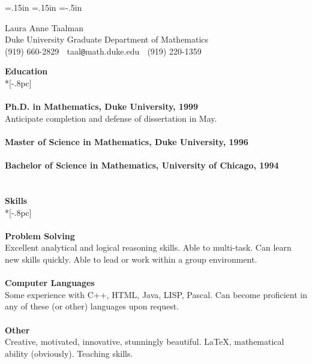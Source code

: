 \oddsidemargin=.15in
\evensidemargin=.15in
\textwidth=6in
\topmargin=-.5in
\textheight=9in
\parindent=0in

\pagestyle{empty}



\begin{center}
{\Large Laura Anne Taalman} \\[.5pc]
Duke University Graduate Department of Mathematics \\
(919) 660-2829 $\;$ taal\verb|@|math.duke.edu $\;$ (919) 220-1359 \\[5pc]
\end{center}

{\large \bf Education} \\*[-.8pc]
\underline{\hspace{6in}} \\
\\
{\bf Ph.D. in Mathematics, Duke University, 1999} \\
Anticipate completion and defense of dissertation in May. \\
\\
{\bf Master of Science in Mathematics, Duke University, 1996} \\
\\
{\bf Bachelor of Science in Mathematics, University of Chicago, 1994}\\
\\
\\
{\large \bf Skills} \\*[-.8pc]
\underline{\hspace{6in}} \\
\\
{\bf Problem Solving} \\
Excellent analytical and logical reasoning skills.  Able to multi-task. 
Can learn new skills quickly. Able to lead or work within a group environment. \\
\\
{\bf Computer Languages} \\
Some experience with C++, HTML, Java, LISP, Pascal. Can become 
proficient in any of these (or other) languages upon request. \\
\\
{\bf Other} \\
Creative, motivated, innovative, stunningly beautiful. 
\LaTeX, mathematical ability (obviously).  Teaching skills. \\
\\
\\
